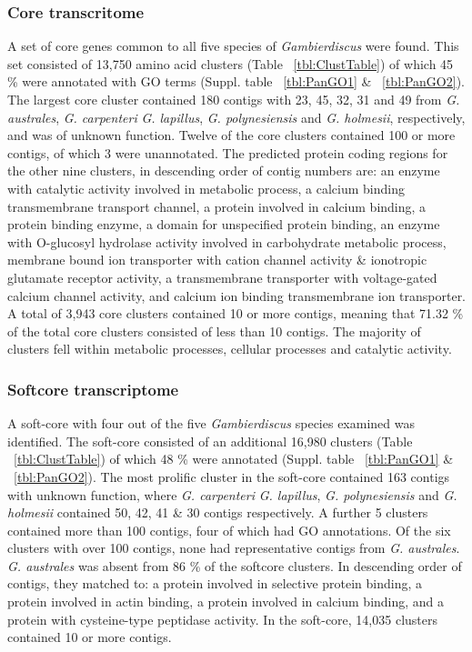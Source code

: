 \documentclass[12pt]{article}
\begin{document}
\subsubsection{Core transcritome}
A set of core genes common to all five species of \textit{Gambierdiscus} were found. 
This set consisted of 13,750 amino acid clusters (Table ~\ref{tbl:ClustTable}) of which 45 \% were annotated with GO terms (Suppl. table ~\ref{tbl:PanGO1} \& ~\ref{tbl:PanGO2}). 
The largest core cluster contained 180 contigs with 
 23, 45, 32, 31 and 49 from \textit{G. australes}, \textit{G. carpenteri} \textit{G. lapillus}, \textit{G. polynesiensis} and \textit{G. holmesii}, respectively, and was of unknown function. 
Twelve of the core clusters contained 100 or more contigs, of which 3 were unannotated. 
The predicted protein coding regions for the other nine clusters, in descending order of contig numbers are: an enzyme with catalytic activity involved in metabolic process, a calcium binding transmembrane transport channel, a protein involved in calcium binding, a protein binding enzyme, a domain for unspecified protein binding, an enzyme with O-glucosyl hydrolase activity involved in carbohydrate metabolic process, membrane bound ion transporter with cation channel activity \& ionotropic glutamate receptor activity, a transmembrane transporter with voltage-gated calcium channel activity, and calcium ion binding transmembrane ion transporter. 
A total of 3,943 core clusters contained 10 or more contigs, meaning that 71.32 \% of the total core clusters consisted of less than 10 contigs. 
The majority of clusters fell within metabolic processes, cellular processes and catalytic activity.%

\subsubsection{Softcore transcriptome}
A soft-core with four out of the five \textit{Gambierdiscus} species examined was identified. 
The soft-core consisted of an additional 16,980 clusters (Table ~\ref{tbl:ClustTable}) of which 48 \% were annotated  (Suppl. table ~\ref{tbl:PanGO1} \& ~\ref{tbl:PanGO2}). 
The most prolific cluster in the soft-core contained 163 contigs with unknown function, where \textit{G. carpenteri} \textit{G. lapillus}, \textit{G. polynesiensis} and \textit{G. holmesii} contained 50, 42, 41 \& 30 contigs respectively. 
A further 5 clusters contained more than 100 contigs, four of which had GO annotations. 
Of the six clusters with over 100 contigs, none had representative contigs from \textit{G. australes}. 
\textit{G. australes} was absent from 86 \% of the softcore clusters. 
In descending order of contigs, they matched to: a protein involved in selective protein binding, a protein involved in actin binding, a protein involved in calcium binding, and a protein with cysteine-type peptidase activity. 
In the soft-core, 14,035 clusters contained 10 or more contigs. 
\end{document}
